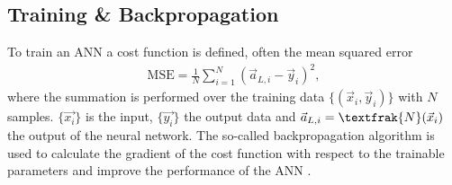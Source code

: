 \subsection{Training \& Backpropagation}
To train an ANN a cost function is defined, often the mean squared error 
\begin{align*}
	\mathrm{MSE} = \frac{1}{N} \sum_{i=1}^N (\vec{a}_{L, i} - \vec{y}_i)^2,
\end{align*}
where the summation is performed over the training data $\{(\vec{x}_i, \vec{y}_i)\}$ with $N$ samples. $\{\vec{x_i}\}$ is the input, $\{\vec{y_i}\}$ the output data and $\vec{a}_{L, i} = \textfrak{N}(\vec{x}_i)$ the output of the neural network.
The so-called backpropagation algorithm is used to calculate the gradient of the cost function with respect to the trainable parameters and improve the performance of the ANN \cite{rumelhart1986learning, nielsenneural}.

